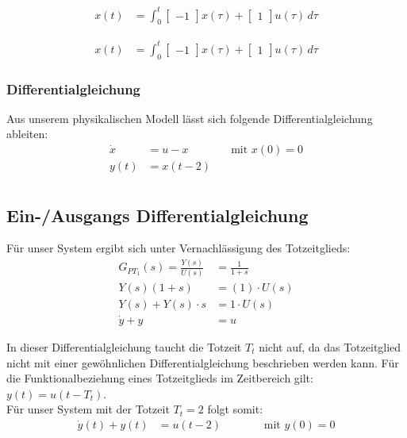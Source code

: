 \noindent
\begin{minipage}{.5\linewidth}   
    \begin{align*}
        x(t) & = \int_{0}^{t} \begin{bmatrix}
            -1
        \end{bmatrix}x(\tau) + \begin{bmatrix}
            1
        \end{bmatrix}u(\tau)\,d\tau
    \end{align*}
\end{minipage}
\begin{minipage}{.5\linewidth}   
    \begin{align*}
        x(t) & = \int_{0}^{t} \begin{bmatrix}
            -1
        \end{bmatrix}x(\tau) + \begin{bmatrix}
            1
        \end{bmatrix}u(\tau)\,d\tau
    \end{align*}
\end{minipage}

\subsubsection{Differentialgleichung}
Aus unserem physikalischen Modell lässt sich folgende Differentialgleichung ableiten:
\begin{align*}
    \dot x & = u - x \enspace \enspace \enspace \enspace \enspace \enspace \enspace \text { mit } x(0) = 0\\
    y(t) & = x(t - 2) \\
\end{align*}

\subsection{Ein-/Ausgangs Differentialgleichung}
Für unser System ergibt sich unter Vernachlässigung des Totzeitglieds:
\begin{align*}
G_{PT_1}(s) =\frac{Y(s)}{U(s)} &= \frac{1}{1 + s} \\
Y(s)(1+s) &= (1) \cdot U(s) \\
Y(s) + Y(s) \cdot s &= 1\cdot U(s) \\
\dot y + y &= u 
\end{align*}

In dieser Differentialgleichung taucht die Totzeit $T_t$ nicht auf, da das Totzeitglied nicht mit einer gewöhnlichen Differentialgleichung beschrieben werden kann. Für die Funktionalbeziehung eines Totzeitglieds im Zeitbereich gilt: $y(t) = u(t-T_t)$. \\
Für unser System mit der Totzeit $T_t = 2$ folgt somit:
\begin{align*}
    \dot y(t) + y(t) &= u(t - 2) \enspace \enspace \enspace \enspace \enspace \enspace \enspace \text { mit } y(0) = 0
\end{align*}

